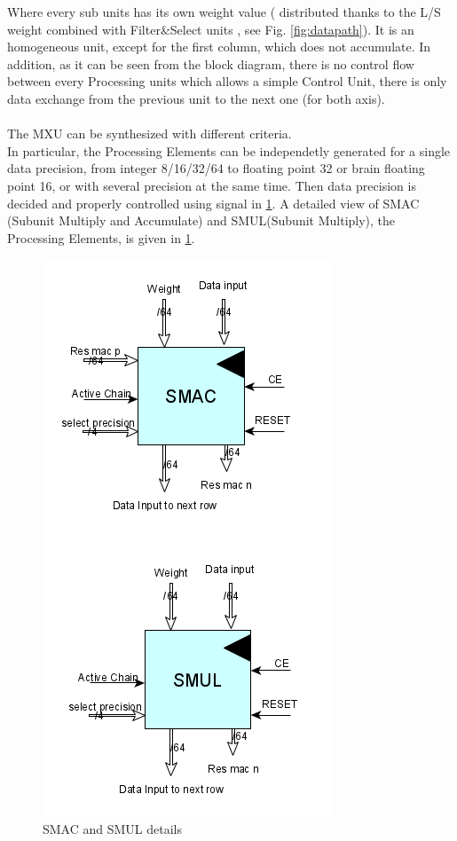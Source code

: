 Where every sub units has its own weight value ( distributed thanks to the L/S weight combined with Filter\&Select units , see Fig. \ref{fig:datapath}). It is an homogeneous unit, except for the first column, which does not accumulate. In addition, as it can be seen from the block diagram, there is no control flow between every Processing units which allows a simple Control Unit, there is only data exchange from the previous unit to the next one (for both axis). \\\\
The MXU can be synthesized with different criteria.\\ In particular, the Processing Elements can be independetly generated for a single data precision, from integer 8/16/32/64 to floating point 32 or brain floating point 16, or with several precision at the same time. Then data precision is decided and properly controlled using signal in \ref{fig:smac}.
\newpage
A detailed view of SMAC (Subunit Multiply and Accumulate) and SMUL(Subunit Multiply), the Processing Elements, is given in \ref{fig:smac}.
\begin{figure}[H]
\centering
\captionsetup{justification=centering}
\includegraphics[scale=0.45,angle=0]{./figure/smac.png}
\caption{SMAC and SMUL details }
\label{fig:smac}
\end{figure} 

